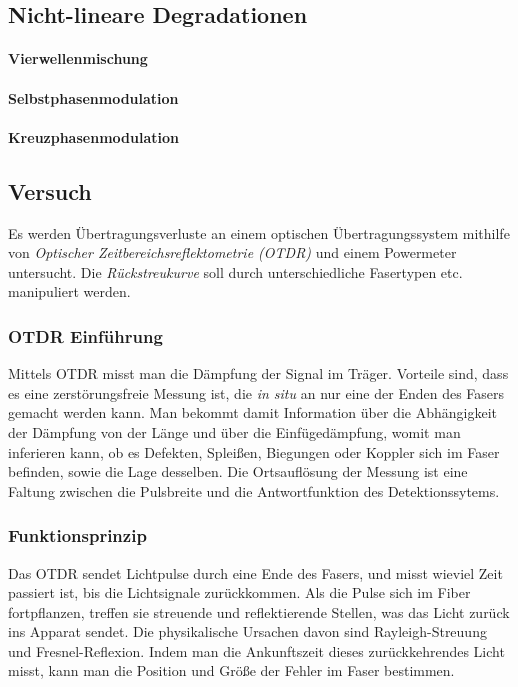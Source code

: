\documentclass[a4paper]{article}
\begin{document}
\subsection{Nicht-lineare Degradationen}
\paragraph{Vierwellenmischung}
\paragraph{Selbstphasenmodulation}
\paragraph{Kreuzphasenmodulation}

\subsection{Versuch}
Es werden Übertragungsverluste an einem optischen Übertragungssystem
mithilfe von \emph{Optischer Zeitbereichsreflektometrie (OTDR)} und
einem Powermeter untersucht.
Die \emph{Rückstreukurve} soll durch unterschiedliche Fasertypen etc.
manipuliert werden.

\subsubsection{OTDR Einführung}
Mittels OTDR misst man die Dämpfung der Signal im Träger. Vorteile sind, dass
es eine zerstörungsfreie Messung ist, die \emph{in situ} an nur eine der Enden
des Fasers gemacht werden kann. Man bekommt damit Information über die
Abhängigkeit der Dämpfung von der Länge und über die Einfügedämpfung, womit man
inferieren kann, ob es Defekten, Spleißen, Biegungen oder Koppler sich im Faser
befinden, sowie die Lage desselben. Die Ortsauflösung der Messung ist eine
Faltung zwischen die Pulsbreite und die Antwortfunktion des Detektionssytems.  

\subsubsection{Funktionsprinzip} Das OTDR sendet Lichtpulse durch eine Ende des
Fasers, und misst wieviel Zeit passiert ist, bis die Lichtsignale zurückkommen.
Als die Pulse sich im Fiber fortpflanzen, treffen sie streuende und
reflektierende Stellen, was das Licht zurück ins Apparat sendet. Die
physikalische Ursachen davon sind Rayleigh-Streuung und Fresnel-Reflexion.
Indem man die Ankunftszeit dieses zurückkehrendes Licht misst, kann man die
Position und Größe der Fehler im Faser bestimmen.
\end{document}
